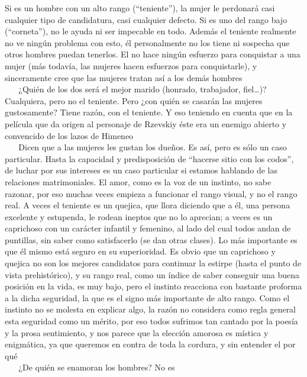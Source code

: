 Si es un hombre con un alto rango (``teniente''), la mujer le perdonará
casi cualquier tipo de candidatura, casi cualquier defecto. Si es uno
del rango bajo (``corneta''), no le ayuda ni ser impecable en todo.
Además el teniente realmente no ve ningún problema con esto, él
personalmente no los tiene ni sospecha que otros hombres puedan
tenerlos. El no hace ningún esfuerzo para conquistar a una mujer (más
todavía, las mujeres hacen esfuerzos para conquistarle), y sinceramente
cree que las mujeres tratan así a los demás hombres\\
\hspace*{0.333em} ~ ~ ¿Quién de los dos será el mejor marido (honrado,
trabajador, fiel\ldots{})? Cualquiera, pero no el teniente. Pero ¿con
quién se casarán las mujeres gustosamente? Tiene razón, con el teniente.
Y eso teniendo en cuenta que en la película que da origen al personaje
de Rzevskiy éste era un enemigo abierto y convencido de los lazos de
Himeneo\\
\hspace*{0.333em} ~ ~ Dicen que a las mujeres les gustan los dueños. Es
así, pero es sólo un caso particular. Hasta la capacidad y
predisposición de ``hacerse sitio con los codos'', de luchar por sus
intereses es un caso particular si estamos hablando de las relaciones
matrimoniales. El amor, como es la voz de un instinto, no sabe razonar,
por eso muchas veces empieza a funcionar el rango visual, y no el rango
real. A veces el teniente es un quejica, que llora diciendo que a él,
una persona excelente y estupenda, le rodean ineptos que no lo aprecian;
a veces es un caprichoso con un carácter infantil y femenino, al lado
del cual todos andan de puntillas, sin saber como satisfacerlo (se dan
otras clases). Lo más importante es que él mismo está seguro en su
superioridad. Es obvio que un caprichoso y quejica no son los mejores
candidatos para continuar la estirpe (hasta el punto de vista
prehistórico), y su rango real, como un índice de saber conseguir una
buena posición en la vida, es muy bajo, pero el instinto reacciona con
bastante proforma a la dicha seguridad, la que es el signo más
importante de alto rango. Como el instinto no se molesta en explicar
algo, la razón no considera como regla general esta seguridad como un
mérito, por eso todos sufrimos tan cantado por la poesía y la prosa
sentimiento, y nos parece que la elección amorosa es mística y
enigmática, ya que queremos en contra de toda la cordura, y sin entender
el por qué\\
\hspace*{0.333em} ~ ~ ¿De quién se enamoran los hombres? No es
